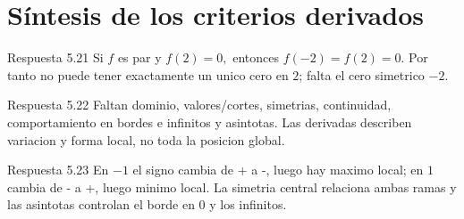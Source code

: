 \documentclass[10pt,a4paper,oneside,openany]{book}
\begin{document}
\section{Síntesis de los criterios derivados}
\begin{PSevenAnswerFixed}{Respuesta 5.21}
Si \(f\) es par y \(f(2)=0,\) entonces \(f(-2)=f(2)=0\). Por tanto no puede tener exactamente un unico cero en \(2\); falta el cero simetrico \(-2\).
\end{PSevenAnswerFixed}
\begin{PSevenAnswerFixed}{Respuesta 5.22}
Faltan dominio, valores/cortes, simetrias, continuidad, comportamiento en bordes e infinitos y asintotas. Las derivadas describen variacion y forma local, no toda la posicion global.
\end{PSevenAnswerFixed}
\begin{PSevenAnswerFixed}{Respuesta 5.23}
En \(-1\) el signo cambia de + a -, luego hay maximo local; en \(1\) cambia de - a +, luego minimo local. La simetria central relaciona ambas ramas y las asintotas controlan el borde en \(0\) y los infinitos.
\end{PSevenAnswerFixed}
\end{document}
